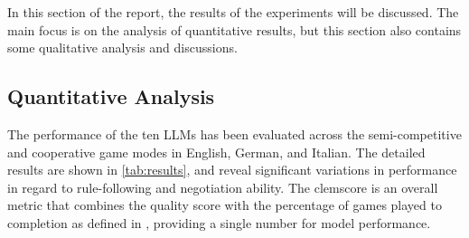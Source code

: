 
In this section of the report, the results of the experiments will be discussed. The main focus is on the analysis of quantitative results, but this section also contains some qualitative analysis and discussions.


\subsection{Quantitative Analysis}

The performance of the ten LLMs has been evaluated across the semi-competitive and cooperative game modes in English, German, and Italian. The detailed results are shown in \cref{tab:results}, and reveal significant variations in performance in regard to rule-following and negotiation ability. The clemscore is an overall metric that combines the quality score with the percentage of games played to completion as defined in \cite{chalamalasetti-etal-2023-clembench}, providing a single number for model performance.


